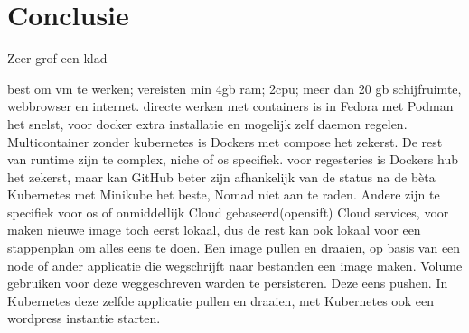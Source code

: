 
\chapter{Conclusie}
\label{ch:conclusie}


Zeer grof een klad 

best om vm te werken; vereisten min 4gb ram; 2cpu;  meer dan 20 gb schijfruimte, webbrowser en internet.
directe werken met containers is in Fedora met Podman het snelst, voor docker extra installatie en mogelijk zelf daemon regelen. Multicontainer zonder kubernetes is Dockers met compose het zekerst. De rest van runtime zijn te complex, niche of os specifiek.
voor regesteries is Dockers hub het  zekerst, maar kan GitHub beter zijn afhankelijk van de status na de bèta
Kubernetes met Minikube het beste, Nomad niet aan te raden. Andere zijn te specifiek voor os of onmiddellijk Cloud gebaseerd(opensift)
Cloud services, voor maken nieuwe image toch eerst lokaal, dus de rest kan ook lokaal
voor een stappenplan om alles eens te doen. Een image pullen en draaien, op basis van een node of ander applicatie die wegschrijft naar bestanden een image maken. Volume gebruiken voor deze weggeschreven warden te persisteren. Deze eens pushen. In Kubernetes deze zelfde applicatie pullen en draaien, met Kubernetes ook een wordpress instantie starten.


